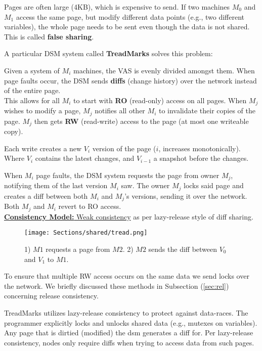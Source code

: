 \begin{theo}

    Pages are often large (4KB), which is expensive to send.
    If two machines $M_0$ and $M_1$ access the same page, but modify different data points (e.g., two different variables),
    the whole page needs to be sent even though the data is not shared. This is called \textbf{false sharing}.
\end{theo}

\noindent
A particular DSM system called \textbf{TreadMarks} solves this problem:
\begin{Def}

    Given a system of $M_i$ machines, the VAS is evenly divided amongst them.
    When page faults occur, the DSM sends \textbf{diffs} (change history) over the network instead of the entire page.\\

    \noindent
    This allows for all $M_i$ to start with \textbf{RO} (read-only) access on all pages. When $M_j$ wishes to 
    modify a page, $M_j$ notifies all other $M_i$ to invalidate their copies of the page. $M_j$ then gets \textbf{RW} (read-write) access to the page (at most one writeable copy).


    Each write creates a new $V_i$ version of the page ($i$, increases monotonically). Where $V_i$ contains the latest changes, and $V_{i-1}$ a snapshot before the changes.
    
    When $M_i$ page faults, the DSM system requests the page from owner $M_j$, notifying them of the last version $M_i$ saw. The owner $M_j$ locks said page and creates a diff between both $M_i$ and $M_j$'s versions, sending it over the network.
    Both $M_j$ and $M_i$ revert to RO access.\\

    \noindent
    \underline{\textbf{Consistency Model:} Weak consistency} as per lazy-release style of diff sharing.
\end{Def}

\vspace{-1em}
\begin{figure}[h]
    \centering
    \texttt{[image: Sections/shared/tread.png]}
    \caption{1) $M1$ requests a page from $M2$. 2) $M2$ sends the diff between $V_0$ and $V_1$ to $M1$.}
    \label{fig:dsm}
\end{figure}

\newpage
\noindent
To ensure that multiple RW access occurs on the same data we send locks over the network.
We briefly discussed these methods in Subsection (\ref{sec:rel}) concerning release consistency.
\begin{Def}

    TreadMarks utilizes lazy-release consistency to protect against data-races.
    The programmer explicitly locks and unlocks shared data (e.g., mutexes on variables).
    Any page that is dirtied (modified) the dsm generates a diff for. Per lazy-release consistency,
    nodes only require diffs when trying to access data from such pages.
\end{Def}

